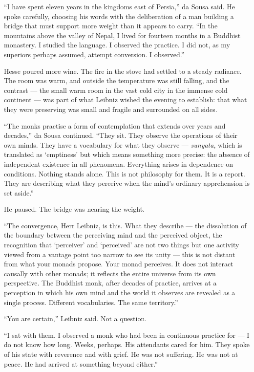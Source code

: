 ``I have spent eleven years in the kingdoms east of Persia,'' da Sousa said. He spoke carefully, choosing his words with the deliberation of a man building a bridge that must support more weight than it appears to carry. ``In the mountains above the valley of Nepal, I lived for fourteen months in a Buddhist monastery. I studied the language. I observed the practice. I did not, as my superiors perhaps assumed, attempt conversion. I observed.''

Hesse poured more wine. The fire in the stove had settled to a steady radiance. The room was warm, and outside the temperature was still falling, and the contrast --- the small warm room in the vast cold city in the immense cold continent --- was part of what Leibniz wished the evening to establish: that what they were preserving was small and fragile and surrounded on all sides.

``The monks practise a form of contemplation that extends over years and decades,'' da Sousa continued. ``They sit. They observe the operations of their own minds. They have a vocabulary for what they observe --- \emph{sunyata}, which is translated as `emptiness' but which means something more precise: the absence of independent existence in all phenomena. Everything arises in dependence on conditions. Nothing stands alone. This is not philosophy for them. It is a report. They are describing what they perceive when the mind's ordinary apprehension is set aside.''

He paused. The bridge was nearing the weight.

``The convergence, Herr Leibniz, is this. What they describe --- the dissolution of the boundary between the perceiving mind and the perceived object, the recognition that `perceiver' and `perceived' are not two things but one activity viewed from a vantage point too narrow to see its unity --- this is not distant from what your monads propose. Your monad perceives. It does not interact causally with other monads; it reflects the entire universe from its own perspective. The Buddhist monk, after decades of practice, arrives at a perception in which his own mind and the world it observes are revealed as a single process. Different vocabularies. The same territory.''

``You are certain,'' Leibniz said. Not a question.

``I sat with them. I observed a monk who had been in continuous practice for --- I do not know how long. Weeks, perhaps. His attendants cared for him. They spoke of his state with reverence and with grief. He was not suffering. He was not at peace. He had arrived at something beyond either.''

